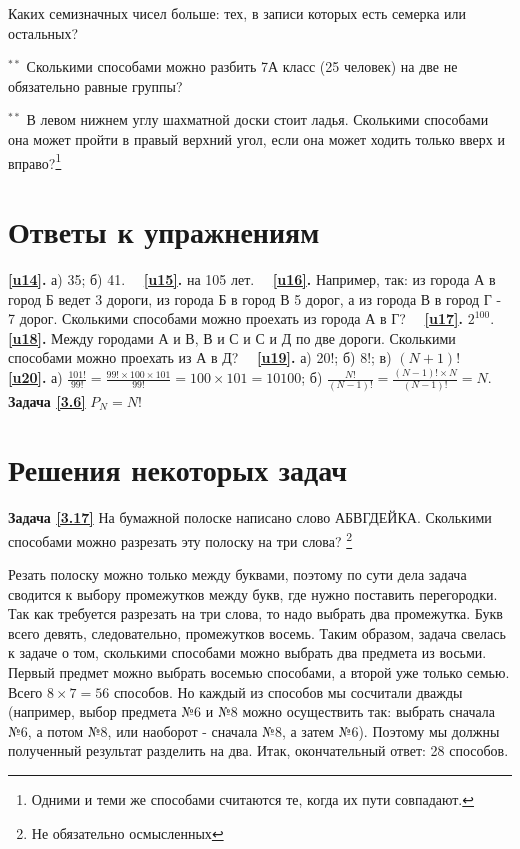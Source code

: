 \begin{thm}
	Каких семизначных чисел больше: тех, в записи которых есть семерка или остальных?
\end{thm}

\begin{thm}$^{\ast\ast}$
	Сколькими способами можно разбить 7А класс (25 человек) на две не обязательно равные группы?
\end{thm}

\begin{thm}$^{\ast\ast}$
	В левом нижнем углу шахматной доски стоит ладья. Сколькими способами она может пройти в правый верхний угол, если она может ходить только вверх и вправо?\footnote{Одними и теми же способами считаются те, когда их пути совпадают.}
\end{thm}
\newpage 

\section{Ответы к упражнениям}
\textbf{\ref{u14}.}	а) 35; б) 41.~~ \textbf{\ref{u15}.} на 105 лет.~~ \textbf{\ref{u16}.} Например, так: из города А в город Б ведет 3 дороги, из города Б в город В 5 дорог, а из города В в город Г - 7 дорог. Сколькими способами можно проехать из города А в Г?~~\textbf{ \ref{u17}.} $2^{100}$.~~ \textbf{\ref{u18}.} Между городами А и В, В и С и С и Д по две дороги. Сколькими способами можно проехать из А в Д?~~ \textbf{\ref{u19}.} а) 20!; б) 8!;  в) $(N+1)!$~~  \textbf{\ref{u20}.} а) $ \frac{101!}{99!}=\frac{99!\times 100\times 101}{99!} = 100\times 101 = 10100$; б) $\frac{N!}{(N-1)!} =\frac{(N-1)!\times N}{(N-1)!} = N$.~~ \textbf{Задача \ref{3.6}}  $P_N=N!$
\section{Решения некоторых задач}
\textbf{Задача \ref{3.17}}
	На бумажной полоске написано слово АБВГДЕЙКА. Сколькими способами можно разрезать эту полоску на три слова? \footnote{Не обязательно осмысленных}

\begin{prf}
	Резать полоску можно только между буквами, поэтому по сути дела задача сводится к выбору промежутков между букв, где нужно поставить перегородки. Так как требуется разрезать на три слова, то надо выбрать два промежутка. Букв всего девять, следовательно, промежутков восемь. Таким образом, задача свелась к задаче о том, сколькими способами можно выбрать два предмета из восьми. Первый предмет можно выбрать восемью способами, а второй уже только семью. Всего $8\times7=56$ способов. Но каждый из способов мы сосчитали дважды (например, выбор предмета №6 и №8 можно осуществить так: выбрать сначала №6, а потом №8, или наоборот - сначала №8, а затем №6). Поэтому мы должны полученный результат разделить на два. Итак, окончательный ответ: 28 способов.
\end{prf}